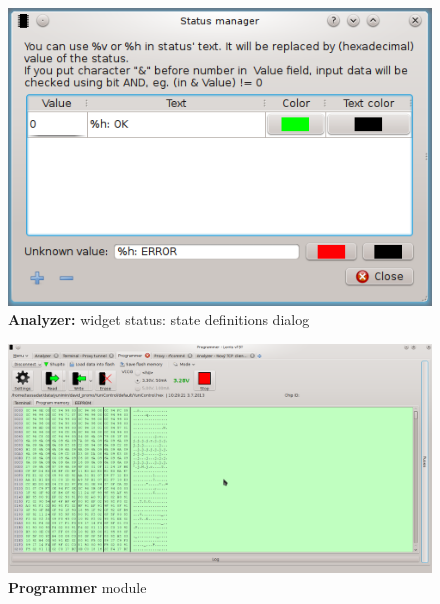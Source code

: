 \documentclass[12pt, a4paper, oneside]{article}
\newcommand{\B}{\textbf} %
\begin{document}
\begin{figure}[H]
\begin{center}
\includegraphics[scale=0.7]{../img/w_status_dlg.png}
\caption{\B{Analyzer:} widget status: state definitions dialog}
\label{status_dlg}
\end{center}
\end{figure}

\begin{figure}[H]
\begin{center}
\includegraphics[width=\textwidth]{../img/programmer.png}
\caption{\B{Programmer} module}
\label{prog_full}
\end{center}
\end{figure}
\end{document}
